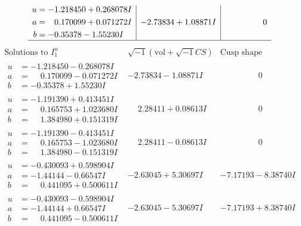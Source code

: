\documentclass[1p]{elsarticle_modified}
\theoremstyle{definition}
\newcommand{\I}{\sqrt{-1}}
\begin{document}
$$\begin{array}{c|c|c}
\begin{aligned}
u &= -1.218450 + 0.268078 I \\
a &= \phantom{-}0.170099 + 0.071272 I \\
b &= -0.35378 - 1.55230 I\end{aligned}
 & -2.73834 + 1.08871 I & \phantom{-0.000000 } 0\\
 \hline 
 \end{array}$$\newpage$$\begin{array}{c|c|c}  
\text{Solutions to }I^u_{1}& \I (\text{vol} + \sqrt{-1}CS) & \text{Cusp shape}\\
 \hline 
\begin{aligned}
u &= -1.218450 - 0.268078 I \\
a &= \phantom{-}0.170099 - 0.071272 I \\
b &= -0.35378 + 1.55230 I\end{aligned}
 & -2.73834 - 1.08871 I & \phantom{-0.000000 } 0 \\ \hline\begin{aligned}
u &= -1.191390 + 0.413451 I \\
a &= \phantom{-}0.165753 + 1.023680 I \\
b &= \phantom{-}1.384980 + 0.151319 I\end{aligned}
 & \phantom{-}2.28411 + 0.08613 I & \phantom{-0.000000 } 0 \\ \hline\begin{aligned}
u &= -1.191390 - 0.413451 I \\
a &= \phantom{-}0.165753 - 1.023680 I \\
b &= \phantom{-}1.384980 - 0.151319 I\end{aligned}
 & \phantom{-}2.28411 - 0.08613 I & \phantom{-0.000000 } 0 \\ \hline\begin{aligned}
u &= -0.430093 + 0.598904 I \\
a &= -1.44144 - 0.66547 I \\
b &= \phantom{-}0.441095 + 0.500611 I\end{aligned}
 & -2.63045 + 5.30697 I & -7.17193 - 8.38740 I \\ \hline\begin{aligned}
u &= -0.430093 - 0.598904 I \\
a &= -1.44144 + 0.66547 I \\
b &= \phantom{-}0.441095 - 0.500611 I\end{aligned}
 & -2.63045 - 5.30697 I & -7.17193 + 8.38740 I \\ \hline\begin{aligned}

\end{aligned}
\end{array}$$
\end{document}
